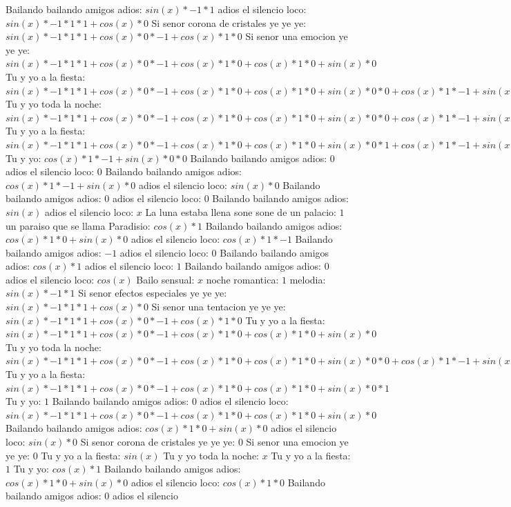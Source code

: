 \documentclass{article}
\begin{document}
\newline Bailando bailando amigos adios: $sin(x)*-1*1$ adios el silencio loco: $sin(x)*-1*1*1+cos(x)*0$ Si senor corona de cristales ye ye ye: ${sin(x)*-1*1*1+cos(x)*0}*-1+cos(x)*1*0$ Si senor una emocion ye ye ye: ${sin(x)*-1*1*1+cos(x)*0}*-1+cos(x)*1*0+cos(x)*1*0+sin(x)*0$ Tu y yo a la fiesta: ${{sin(x)*-1*1*1+cos(x)*0}*-1+cos(x)*1*0+cos(x)*1*0+sin(x)*0}*0+{cos(x)*1*-1+sin(x)*0}*0$ Tu y yo toda la noche: ${{sin(x)*-1*1*1+cos(x)*0}*-1+cos(x)*1*0+cos(x)*1*0+sin(x)*0}*0+{cos(x)*1*-1+sin(x)*0}*0+{cos(x)*1*-1+sin(x)*0}*0+sin(x)*-1*0$ Tu y yo a la fiesta: ${{sin(x)*-1*1*1+cos(x)*0}*-1+cos(x)*1*0+cos(x)*1*0+sin(x)*0}*1+{cos(x)*1*-1+sin(x)*0}*0$  \newline Tu y yo: ${cos(x)*1*-1+sin(x)*0}*0$ Bailando bailando amigos adios: $0$ adios el silencio loco: $0$  \newline Bailando bailando amigos adios: $cos(x)*1*-1+sin(x)*0$  \newline adios el silencio loco: $sin(x)*0$ Bailando bailando amigos adios: $0$ adios el silencio loco: $0$  \newline Bailando bailando amigos adios: $sin(x)$  \newline adios el silencio loco: $x$ La luna estaba llena sone sone de un palacio: $1$  \newline un paraiso que se llama Paradisio: $cos(x)*1$ Bailando bailando amigos adios: $cos(x)*1*0+sin(x)*0$ adios el silencio loco: $cos(x)*1*-1$ Bailando bailando amigos adios: $-1$ adios el silencio loco: $0$  \newline Bailando bailando amigos adios: $cos(x)*1$ adios el silencio loco: $1$ Bailando bailando amigos adios: $0$  \newline adios el silencio loco: $cos(x)$  \newline Bailo sensual: $x$ noche romantica: $1$  \newline melodia: $sin(x)*-1*1$ Si senor efectos especiales ye ye ye: $sin(x)*-1*1*1+cos(x)*0$ Si senor una tentacion ye ye ye: ${sin(x)*-1*1*1+cos(x)*0}*-1+cos(x)*1*0$ Tu y yo a la fiesta: ${sin(x)*-1*1*1+cos(x)*0}*-1+cos(x)*1*0+cos(x)*1*0+sin(x)*0$ Tu y yo toda la noche: ${{sin(x)*-1*1*1+cos(x)*0}*-1+cos(x)*1*0+cos(x)*1*0+sin(x)*0}*0+{cos(x)*1*-1+sin(x)*0}*0$ Tu y yo a la fiesta: ${{sin(x)*-1*1*1+cos(x)*0}*-1+cos(x)*1*0+cos(x)*1*0+sin(x)*0}*1$ Tu y yo: $1$ Bailando bailando amigos adios: $0$  \newline adios el silencio loco: ${sin(x)*-1*1*1+cos(x)*0}*-1+cos(x)*1*0+cos(x)*1*0+sin(x)*0$  \newline Bailando bailando amigos adios: $cos(x)*1*0+sin(x)*0$  \newline adios el silencio loco: $sin(x)*0$ Si senor corona de cristales ye ye ye: $0$ Si senor una emocion ye ye ye: $0$  \newline Tu y yo a la fiesta: $sin(x)$  \newline Tu y yo toda la noche: $x$ Tu y yo a la fiesta: $1$  \newline Tu y yo: $cos(x)*1$ Bailando bailando amigos adios: $cos(x)*1*0+sin(x)*0$ adios el silencio loco: $cos(x)*1*0$ Bailando bailando amigos adios: $0$ adios el silencio 
\end{document}

